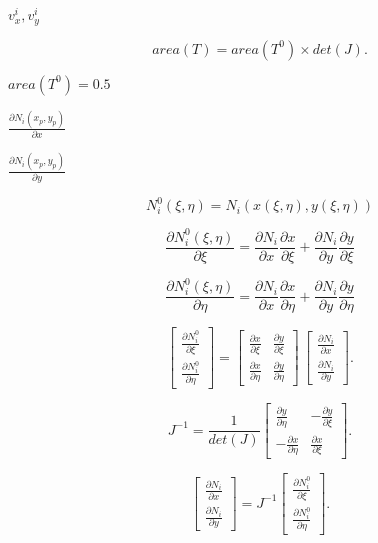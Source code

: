 \documentclass{article}
\begin{document}
$ v^i_x, v^i_y $
\pagebreak

\[ area(T) = area (T^0) \times det(J). \]
\pagebreak

$ area(T^0) = 0.5 $
\pagebreak

$ \frac{\partial N_i(x_p, y_p)}{\partial x}$
\pagebreak

$ \frac{\partial N_i(x_p, y_p)}{\partial y}$
\pagebreak

\[ N^0_i(\xi, \eta) = N_i(x(\xi,\eta), y(\xi, \eta)) \]
\pagebreak

\[ \frac{\partial N^0_i(\xi, \eta)}{\partial \xi} = \frac{\partial N_i}{\partial x} \frac{\partial x}{\partial \xi} + \frac{\partial N_i}{\partial y} \frac{\partial y}{\partial \xi} \]
\pagebreak

\[ \frac{\partial N^0_i(\xi, \eta)}{\partial \eta} = \frac{\partial N_i}{\partial x} \frac{\partial x}{\partial \eta} + \frac{\partial N_i}{\partial y} \frac{\partial y}{\partial \eta} \]
\pagebreak

\[ \left[ {\begin{array}{c} \frac{\partial N^0_i}{\partial \xi} \\ \frac{\partial N^0_i}{\partial \eta} \end{array}}\right] = \left[ {\begin{array}{cc} \frac{\partial x}{\partial \xi} & \frac{\partial y}{\partial \xi} \\ \frac{\partial x}{\partial \eta} & \frac{\partial y}{\partial \eta} \end{array}}\right] \, \left[ {\begin{array}{c} \frac{\partial N_i}{\partial x} \\ \frac{\partial N_i}{\partial y} \end{array}}\right]. \]
\pagebreak

\[ J^{-1} = \frac{1}{det(J)} \left[ {\begin{array}{cc} \frac{\partial y}{\partial \eta} & -\frac{\partial y}{\partial \xi} \\ -\frac{\partial x}{\partial \eta} & \frac{\partial x}{\partial \xi} \end{array}}\right]. \]
\pagebreak

\[ \left[ {\begin{array}{c} \frac{\partial N_i}{\partial x} \\ \frac{\partial N_i}{\partial y} \end{array}}\right] = J^{-1} \left[ {\begin{array}{c} \frac{\partial N^0_i}{\partial \xi} \\ \frac{\partial N^0_i}{\partial \eta} \end{array}}\right]. \]
\pagebreak
\end{document}
